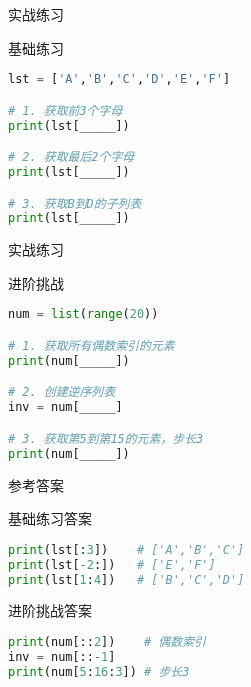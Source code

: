 \documentclass{beamer}
\begin{document}
\begin{frame}[fragile]{实战练习}
\begin{block}{基础练习}
\begin{lstlisting}[language=Python]
lst = ['A','B','C','D','E','F']

# 1. 获取前3个字母
print(lst[_____])

# 2. 获取最后2个字母
print(lst[_____])

# 3. 获取B到D的子列表
print(lst[_____])
\end{lstlisting}
\end{block}
\end{frame}

\begin{frame}[fragile]{实战练习}
\begin{block}{进阶挑战}
\begin{lstlisting}[language=Python]
num = list(range(20))

# 1. 获取所有偶数索引的元素
print(num[_____])

# 2. 创建逆序列表
inv = num[_____]

# 3. 获取第5到第15的元素，步长3
print(num[_____])
\end{lstlisting}
\end{block}
\end{frame}

\begin{frame}[fragile]{参考答案}
\begin{block}{基础练习答案}
\begin{lstlisting}[language=Python]
print(lst[:3])    # ['A','B','C']
print(lst[-2:])   # ['E','F'] 
print(lst[1:4])   # ['B','C','D']
\end{lstlisting}
\end{block}

\begin{block}{进阶挑战答案}
\begin{lstlisting}[language=Python]
print(num[::2])    # 偶数索引
inv = num[::-1]
print(num[5:16:3]) # 步长3
\end{lstlisting}
\end{block}
\end{frame}
\end{document}
